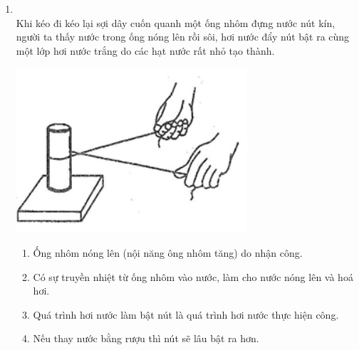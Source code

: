 \begin{enumerate}[label=\bfseries Câu \arabic*:, leftmargin=1.7cm]
\item {}\\
Khi kéo đi kéo lại sợi dây cuốn quanh một ống nhôm đựng nước nút kín, người ta thấy nước trong ống nóng lên rồi sôi, hơi nước đẩy nút bật ra cùng một lớp hơi nước trắng do các hạt nước rất nhỏ tạo thành.
\begin{center}
	\includegraphics[width=0.3\linewidth]{../figs/VN12-Y24-PH-SYL-003P-4}
\end{center}
\begin{enumerate}[label=\alph*)]
	\item Ống nhôm nóng lên (nội năng ông nhôm tăng) do nhận công.
	\item Có sự truyền nhiệt từ ống nhôm vào nước, làm cho nước nóng lên và hoá hơi.
	\item Quá trình hơi nước làm bật nút là quá trình hơi nước thực hiện công.
	\item Nếu thay nước bằng rượu thì nút sẽ lâu bật ra hơn.
\end{enumerate}


\end{enumerate}
